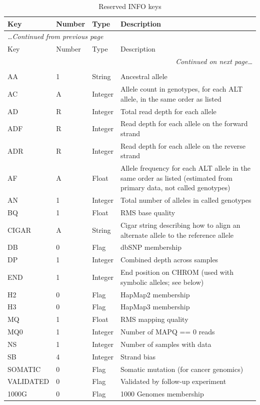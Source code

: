 \documentclass[8pt]{article}
\begin{document}
\begin{longtable}[c]{ | p{2.5cm} | p{1.5cm} | p{1.5cm} | p{10.3cm} | }
	\hline
	Key		& Number	& Type		& Description \\ \hline
  \endfirsthead
	\multicolumn{4}{l}{\small\emph{\ldots Continued from previous page}} \\[0.7ex]
	\hline
	Key		& Number	& Type		& Description \\ \hline
  \endhead
	\hline
	\multicolumn{4}{r}{\small\emph{Continued on next page\ldots}} \\
	\caption[]{Reserved INFO keys}
  \endfoot
	\hline
	\multicolumn{4}{l}{} \\
	\caption{Reserved INFO keys}
	\label{table:reserved-info}
  \endlastfoot
	AA		& 1		& String	& Ancestral allele \\
	AC		& A		& Integer	& Allele count in genotypes, for each ALT allele, in the same order as listed  \\
	AD		& R		& Integer	& Total read depth for each allele \\
	ADF		& R		& Integer	& Read depth for each allele on the forward strand \\
	ADR		& R		& Integer	& Read depth for each allele on the reverse strand \\
	AF		& A		& Float		& Allele frequency for each ALT allele in the same order as listed (estimated from primary data, not called genotypes) \\
	AN		& 1		& Integer	& Total number of alleles in called genotypes \\
	BQ   		& 1		& Float		& RMS base quality \\
	CIGAR		& A		& String	& Cigar string describing how to align an alternate allele to the reference allele \\
	DB		& 0		& Flag		& dbSNP membership \\
	DP		& 1		& Integer	& Combined depth across samples \\
	END		& 1		& Integer	& End position on CHROM (used with symbolic alleles; see below) \\
	H2		& 0		& Flag		& HapMap2 membership \\
	H3		& 0		& Flag		& HapMap3 membership \\
	MQ		& 1		& Float		& RMS mapping quality \\
	MQ0   		& 1		& Integer	& Number of MAPQ == 0 reads \\
	NS		& 1		& Integer	& Number of samples with data \\
	SB		& 4		& Integer	& Strand bias \\
	SOMATIC		& 0		& Flag		& Somatic mutation (for cancer genomics) \\
	VALIDATED	& 0		& Flag		& Validated by follow-up experiment \\
	1000G		& 0		& Flag		& 1000 Genomes membership \\
\end{longtable}
\end{document}
